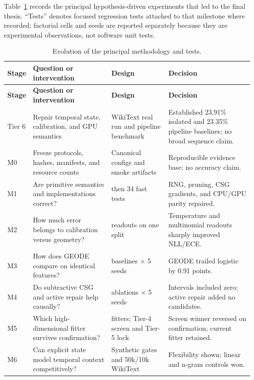 \documentclass[12pt,oneside]{report}
\begin{document}
Table~\ref{tab:evolution-ledger} records the principal hypothesis-driven
experiments that led to the final thesis. ``Tests'' denotes focused regression
tests attached to that milestone where recorded; factorial cells and seeds are
reported separately because they are experimental observations, not software
unit tests.

\begin{longtable}{
>{\raggedright\arraybackslash}p{0.6in}
>{\raggedright\arraybackslash}p{1.45in}
>{\raggedright\arraybackslash}p{0.9in}
>{\raggedright\arraybackslash}p{1.95in}}
\caption{Evolution of the principal methodology and tests.}
\label{tab:evolution-ledger}\\
\toprule
\textbf{Stage} & \textbf{Question or intervention} & \textbf{Design} &
\textbf{Decision}\\
\midrule
\endfirsthead
\toprule
\textbf{Stage} & \textbf{Question or intervention} & \textbf{Design} &
\textbf{Decision}\\
\midrule
\endhead
Tier 6 & Repair temporal state, calibration, and GPU semantics & WikiText real
run and pipeline benchmark & Established 23.91\% isolated and 23.35\% pipeline
baselines; no broad sequence claim.\\
M0 & Freeze protocols, hashes, manifests, and resource counts & Canonical
configs and smoke artifacts & Reproducible evidence base; no accuracy claim.\\
M1 & Are primitive semantics and implementations correct? & 28 then 34 fast
tests & RNG, pruning, CSG gradients, and CPU/GPU parity repaired.\\
M2 & How much error belongs to calibration versus geometry? & 5 readouts on one
split & Temperature and multinomial readouts sharply improved NLL/ECE.\\
M3 & How does GEODE compare on identical features? & 8 baselines $\times$ 5
seeds & GEODE trailed logistic by 0.91 points.\\
M4 & Do subtractive CSG and active repair help causally? & 3 ablations $\times$
5 seeds & Intervals included zero; active repair added no candidates.\\
M5 & Which high-dimensional fitter survives confirmation? & 7 fitters; Tier-4
screen and Tier-5 lock & Screen winner reversed on confirmation; current fitter
retained.\\
M6 & Can explicit state model temporal context competitively? & Synthetic gates
and 50k/10k WikiText & Flexibility shown; linear and n-gram controls won.\\

\end{longtable}
\end{document}
